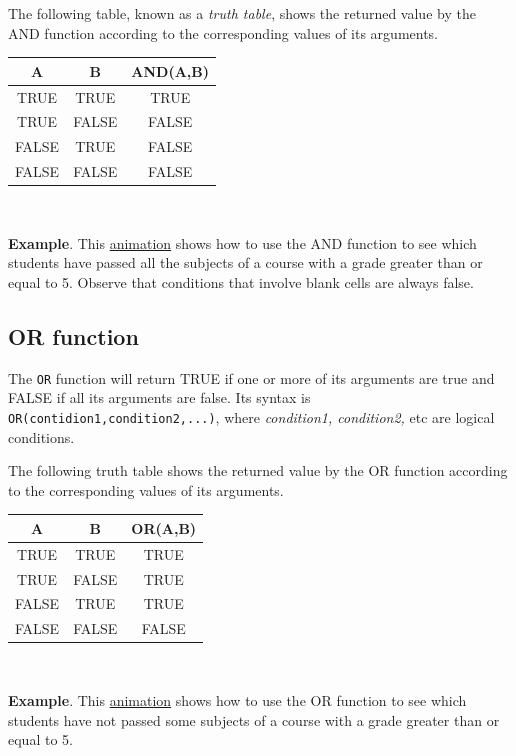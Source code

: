 The following table, known as a \emph{truth table}, shows the returned value by the AND function according to the
corresponding values of its arguments.

\begin{longtable}{|c|c|c|}
\hline
A & B & AND(A,B)\\
\hline
TRUE & TRUE & TRUE\\
TRUE & FALSE & FALSE\\
FALSE & TRUE & FALSE\\
FALSE & FALSE & FALSE\\
\hline
\end{longtable}

~{}

\textbf{Example}. This \href{http://aprendeconalf.es/office/excel/manual/img/example_function_and.gif}{animation} shows how to use the AND function to see which students have passed all the subjects of a course with a grade greater than or equal to 5. Observe that conditions that involve blank cells are always false.

\subsection{OR function}\hypertarget{or-function}{}\label{or-function}

The \texttt{OR} function will return TRUE if one or more of its arguments are true and FALSE if all its arguments are false. Its syntax is \texttt{OR(contidion1,condition2,...)}, where \emph{condition1, condition2,} etc are logical conditions.

The following truth table shows the returned value by the OR function according to the corresponding values of its
arguments.

\begin{longtable}{|c|c|c|}
\hline
A & B & OR(A,B)\\
\hline
TRUE & TRUE & TRUE\\
TRUE & FALSE & TRUE\\
FALSE & TRUE & TRUE\\
FALSE & FALSE & FALSE\\
\hline
\end{longtable}

~{}

\textbf{Example}. This \href{http://aprendeconalf.es/office/excel/manual/img/example_function_or.gif}{animation} shows how to use the OR function to see which students have not passed some subjects of a course with a grade greater than or equal to 5.

